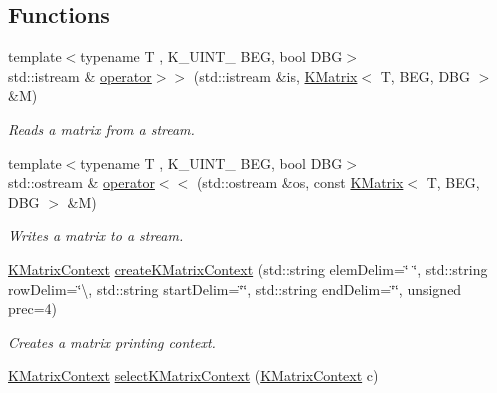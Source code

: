 \subsection*{Functions}
\begin{DoxyCompactItemize}
\item 
{\footnotesize template$<$typename T , K\+\_\+\+U\+I\+N\+T\+\_ B\+EG, bool D\+BG$>$ }\\std\+::istream \& \mbox{\hyperlink{namespaceKalman_a72ce00e837fa126ab3961f879e3d8b87}{operator$>$$>$}} (std\+::istream \&is, \mbox{\hyperlink{classKalman_1_1KMatrix}{K\+Matrix}}$<$ T, B\+EG, D\+BG $>$ \&M)
\begin{DoxyCompactList}\small\item\em Reads a matrix from a stream. \end{DoxyCompactList}\item 
{\footnotesize template$<$typename T , K\+\_\+\+U\+I\+N\+T\+\_ B\+EG, bool D\+BG$>$ }\\std\+::ostream \& \mbox{\hyperlink{namespaceKalman_a531684dadbec9b34313492f6d5121598}{operator$<$$<$}} (std\+::ostream \&os, const \mbox{\hyperlink{classKalman_1_1KMatrix}{K\+Matrix}}$<$ T, B\+EG, D\+BG $>$ \&M)
\begin{DoxyCompactList}\small\item\em Writes a matrix to a stream. \end{DoxyCompactList}\item 
\mbox{\label{namespaceKalman_a2cdf35271265736a5d7021c18233ae34}} 
\mbox{\hyperlink{namespaceKalman_a7c967f82c4d1bd0565bf8ce864a32fa2}{K\+Matrix\+Context}} \mbox{\hyperlink{namespaceKalman_a2cdf35271265736a5d7021c18233ae34}{create\+K\+Matrix\+Context}} (std\+::string elem\+Delim=\char`\"{} \char`\"{}, std\+::string row\+Delim=\char`\"{}\textbackslash{}, std\+::string start\+Delim=\char`\"{}\char`\"{}, std\+::string end\+Delim=\char`\"{}\char`\"{}, unsigned prec=4)
\begin{DoxyCompactList}\small\item\em Creates a matrix printing context. \end{DoxyCompactList}\item 
\mbox{\label{namespaceKalman_a1a0ed1b72b32aa8a1a12bb4212539807}} 
\mbox{\hyperlink{namespaceKalman_a7c967f82c4d1bd0565bf8ce864a32fa2}{K\+Matrix\+Context}} \mbox{\hyperlink{namespaceKalman_a1a0ed1b72b32aa8a1a12bb4212539807}{select\+K\+Matrix\+Context}} (\mbox{\hyperlink{namespaceKalman_a7c967f82c4d1bd0565bf8ce864a32fa2}{K\+Matrix\+Context}} c)

\end{DoxyCompactItemize}
